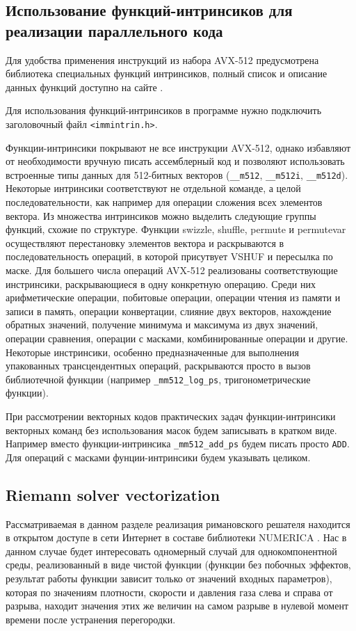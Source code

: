 \documentclass[
11pt,%
tightenlines,%
twoside,%
onecolumn,%
nofloats,%
nobibnotes,%
nofootinbib,%
superscriptaddress,%
noshowpacs,%
centertags]%
{revtex4}
\begin{document}
\subsection{Использование функций-интринсиков для реализации параллельного кода}

Для удобства применения инструкций из набора AVX-512 предусмотрена библиотека специальных функций интринсиков, полный список и описание данных функций доступно на сайте \cite{Intel_Intr}.

Для использования функций-интринсиков в программе нужно подключить заголовочный файл \texttt{<immintrin.h>}.

Функции-интринсики покрывают не все инструкции AVX-512, однако избавляют от необходимости вручную писать ассемблерный код и позволяют использовать встроенные типы данных для 512-битных векторов (\texttt{\_\_m512}, \texttt{\_\_m512i}, \texttt{\_\_m512d}).
Некоторые интринсики соответствуют не отдельной команде, а целой последовательности, как например для операции сложения всех элементов вектора.
Из множества интринсиков можно выделить следующие группы функций, схожие по структуре.
Функции swizzle, shuffle, permute и permutevar осуществляют перестановку элементов вектора и раскрываются в последовательность операций, в которой присутвует VSHUF и пересылка по маске.
Для большего числа операций AVX-512 реализованы соответствующие инстринсики, раскрывающиеся в одну конкретную операцию.
Среди них арифметические операции, побитовые операции, операции чтения из памяти и записи в память, операции конвертации, слияние двух векторов, нахождение обратных значений, получение минимума и максимума из двух значений, операции сравнения, операции с масками, комбинированные операции и другие.
Некоторые инстринсики, особенно предназначенные для выполнения упакованных трансцендентных операций, раскрываются просто в вызов библиотечной функции (например \texttt{\_mm512\_log\_ps}, тригонометрические функции).

При рассмотрении векторных кодов практических задач функции-интринсики векторных команд без использования масок будем записывать в кратком виде.
Например вместо функции-интринсика \texttt{\_mm512\_add\_ps} будем писать просто \texttt{ADD}.
Для операций с масками фунции-интринсики будем указывать целиком.

\subsection{Riemann solver vectorization}

Рассматриваемая в данном разделе реализация римановского решателя находится в открытом доступе в сети Интернет в составе библиотеки NUMERICA \cite{Numerica}.
Нас в данном случае будет интересовать одномерный случай для однокомпонентной среды, реализованный в виде чистой функции (функции без побочных эффектов, результат работы функции зависит только от значений входных параметров), которая по значениям плотности, скорости и давления газа слева и справа от разрыва, находит значения этих же величин на самом разрыве в нулевой момент времени после устранения перегородки.
\end{document}
